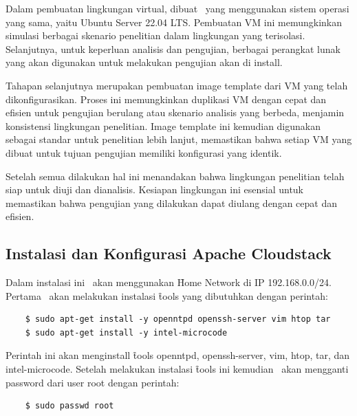 Dalam pembuatan lingkungan virtual, dibuat \vm\ yang menggunakan sistem operasi yang sama, yaitu Ubuntu Server 22.04 LTS. Pembuatan VM ini memungkinkan simulasi berbagai skenario penelitian dalam lingkungan yang terisolasi. Selanjutnya, untuk keperluan analisis dan pengujian, berbagai perangkat lunak yang akan digunakan untuk melakukan pengujian akan di install.

Tahapan selanjutnya merupakan pembuatan image template dari VM yang telah dikonfigurasikan. Proses ini memungkinkan duplikasi VM dengan cepat dan efisien untuk pengujian berulang atau skenario analisis yang berbeda, menjamin konsistensi lingkungan penelitian. Image template ini kemudian digunakan sebagai standar untuk penelitian lebih lanjut, memastikan bahwa setiap VM yang dibuat untuk tujuan pengujian memiliki konfigurasi yang identik.

Setelah semua dilakukan hal ini menandakan bahwa lingkungan penelitian telah siap untuk diuji dan dianalisis. Kesiapan lingkungan ini esensial untuk memastikan bahwa pengujian yang dilakukan dapat diulang dengan cepat dan efisien.

\subsection{Instalasi dan Konfigurasi Apache Cloudstack}
Dalam instalasi ini \saya\ akan menggunakan \f{Home Network} di IP 192.168.0.0/24. Pertama \saya\ akan melakukan instalasi \f{tools} yang dibutuhkan dengan perintah:

\begin{listing}[H]
    \begin{verbatim}
    $ sudo apt-get install -y openntpd openssh-server vim htop tar
    $ sudo apt-get install -y intel-microcode
    \end{verbatim}
\end{listing}

Perintah ini akan menginstall \f{tools} openntpd, openssh-server, vim, htop, tar, dan intel-microcode. Setelah melakukan instalasi \f{tools} ini kemudian \saya\ akan mengganti password dari user root dengan perintah:

\begin{listing}[H]
    \begin{verbatim}
    $ sudo passwd root
    \end{verbatim}
\end{listing}

